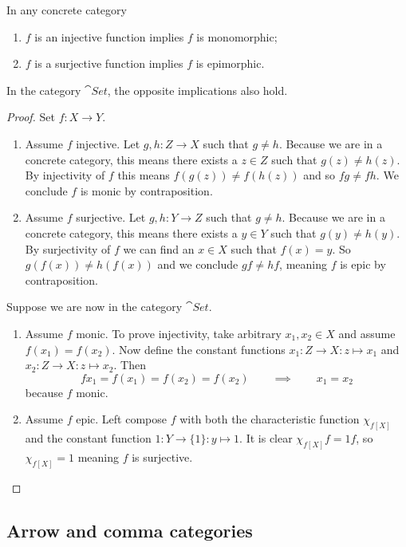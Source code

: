 \begin{proposition} \label{injectiveMonoSurjectiveEpi}
In any concrete category
\begin{enumerate}
\item $f$ is an injective function implies $f$ is monomorphic;
\item $f$ is a surjective function implies $f$ is epimorphic.
\end{enumerate}
In the category $\cat{Set}$, the opposite implications also hold.
\end{proposition}
\begin{proof}
Set $f:X\to Y$.
\begin{enumerate}
\item Assume $f$ injective. Let $g,h: Z\to X$ such that $g\neq h$. Because we are in a concrete category, this means there exists a $z\in Z$ such that $g(z) \neq h(z)$. By injectivity of $f$ this means $f(g(z)) \neq f(h(z))$ and so $fg \neq fh$. We conclude $f$ is monic by contraposition.
\item Assume $f$ surjective. Let $g,h: Y\to Z$ such that $g\neq h$. Because we are in a concrete category, this means there exists a $y\in Y$ such that $g(y) \neq h(y)$. By surjectivity of $f$ we can find an $x\in X$ such that $f(x) = y$. So $g(f(x)) \neq h(f(x))$ and we conclude $gf \neq hf$, meaning $f$ is epic by contraposition.
\end{enumerate}
Suppose we are now in the category $\cat{Set}$.
\begin{enumerate}
\item Assume $f$ monic. To prove injectivity, take arbitrary $x_1,x_2\in X$ and assume $f(x_1) = f(x_2)$. Now define the constant functions $x_1: Z\to X: z\mapsto x_1$ and $x_2: Z\to X: z\mapsto x_2$. Then
\[ fx_1 = f(x_1) = f(x_2) = f(x_2) \qquad \implies \qquad x_1 = x_2 \]
because $f$ monic.
\item Assume $f$ epic. Left compose $f$ with both the characteristic function $\chi_{f[X]}$ and the constant function $1: Y\to \{1\}: y\mapsto 1$. It is clear $\chi_{f[X]}f = 1f$, so $\chi_{f[X]} = 1$ meaning $f$ is surjective.
\end{enumerate}
\end{proof}

\subsection{Arrow and comma categories}
